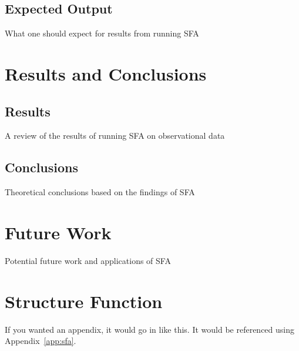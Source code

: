 \documentclass[12pt, oneside]{smuthesis}
\begin{document}
\section{\sc Expected Output} \label{expectedOutput}

What one should expect for results from running SFA

\chapter{\sc Results and Conclusions} \label{resultsConclusions}

\section{\sc Results} \label{results}

A review of the results of running SFA on observational data

\section{\sc Conclusions} \label{conclusions}

Theoretical conclusions based on the findings of SFA

\chapter{\sc Future Work} \label{futureWork}

Potential future work and applications of SFA


\appendix

\chapter{Structure Function} \label{appendixSFA}
\label{app:sfa}
If you wanted an appendix, it would go in like this.  It would be 
referenced using Appendix~\ref{app:sfa}.


\begin{singlespace}

\end{singlespace}
\end{document}
